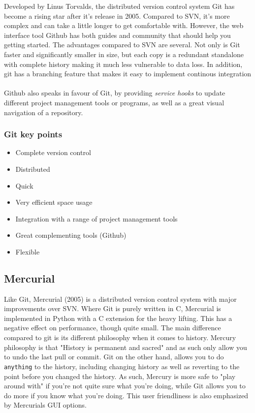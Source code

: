 \documentclass{report}
\begin{document}
Developed by Linus Torvalds, the distributed version control system Git\cite{website:git} has become a rising star after it's release in 2005\cite{website:git_history}. Compared to SVN, it's more complex and can take a little longer to get comfortable with. However, the web interface tool Github\cite{website:github} has both guides and community that should help you getting started. The advantages compared to SVN are several. Not only is Git faster and significantly smaller in size, but each copy is a redundant standalone with complete history making it much less vulnerable to data loss\cite{website:git_vs_svn}. In addition, git has a branching feature that makes it easy to implement continous integration\cite{website:continous_integration}  \\  \\
Github also speaks in favour of Git, by providing \emph{service hooks} to update different project management tools or programs\cite{website:git_servicehooks}, as well as a great visual navigation of a repository.

\subsubsection{Git key points}

\begin{itemize}
\item Complete version control
\item Distributed
\item Quick 
\item Very efficient space usage 
\item Integration with a range of project management tools 
\item Great complementing tools (Github)
\item Flexible
\end{itemize}

\subsection{Mercurial}  \label{sec:mercurial}
Like Git, Mercurial\cite{website:mercurial} (2005) is a distributed version control system with major improvements over SVN. Where Git is purely written in C, Mercurial is implemented in Python with a C extension for the heavy lifting\cite{website:importantshock_git_vs_mercurial}. This has a negative effect on performance, though quite small. The main difference compared to git is its different philosophy when it comes to history. Mercury philosophy is that "History is permanent and sacred" and as such only allow you to undo the last pull or commit\cite{website_git_vs_mercurial}. Git on the other hand, allows you to do \verb|anything| to the history, including changing history as well as reverting to the point before you changed the history\cite{website:mercurial_vs_git}. As such, Mercury is more safe to "play around with" if you're not quite sure what you're doing, while Git allows you to do more if you know what you're doing. This user friendliness is also emphasized by Mercurials GUI options\cite{website:git_vs_mercurial}.
\end{document}
